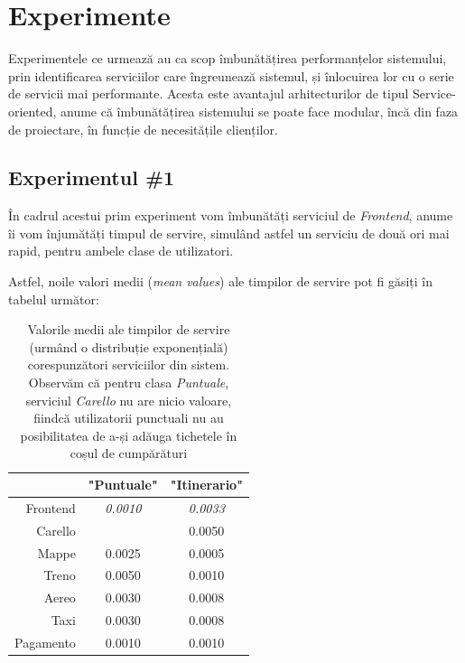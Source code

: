 \documentclass[12pt]{article}
\begin{document}
    \section{Experimente}
        Experimentele ce urmează au ca scop îmbunătățirea performanțelor sistemului, prin identificarea serviciilor care îngreunează sistemul, și înlocuirea lor cu o serie de servicii mai performante. Acesta este avantajul arhitecturilor de tipul Service-oriented, anume că îmbunătățirea sistemului se poate face modular, încă din faza de proiectare, în funcție de necesitățile clienților.

        \subsection{Experimentul \#1}
            În cadrul acestui prim experiment vom îmbunătăți serviciul de \textit{Frontend}, anume îi vom înjumătăți timpul de servire, simulând astfel un serviciu de două ori mai rapid, pentru ambele clase de utilizatori.

            Astfel, noile valori medii (\textit{mean values}) ale timpilor de servire pot fi găsiți în tabelul următor:

            \begin{table}[!h]
                \centering
                \begin{tabular}{r|cc}
                    \multicolumn{1}{c|}{} & "Puntuale"      & "Itinerario"    \\ \hline
                    Frontend              & \textit{0.0010} & \textit{0.0033} \\
                    Carello               &                 & 0.0050          \\
                    Mappe                 & 0.0025          & 0.0005          \\
                    Treno                 & 0.0050          & 0.0010          \\
                    Aereo                 & 0.0030          & 0.0008          \\
                    Taxi                  & 0.0030          & 0.0008          \\
                    Pagamento             & 0.0010          & 0.0010         
                \end{tabular}
                \caption{Valorile medii ale timpilor de servire (urmând o distribuție exponențială) corespunzători serviciilor din sistem. Observăm că pentru clasa \textit{Puntuale}, serviciul \textit{Carello} nu are nicio valoare, fiindcă utilizatorii punctuali nu au posibilitatea de a-și adăuga tichetele în coșul de cumpărături}
            \end{table}
\end{document}
